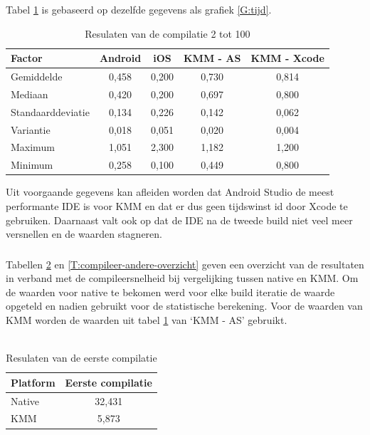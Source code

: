 Tabel \ref{T:compileer-andere} is gebaseerd op dezelfde gegevens als grafiek \ref{G:tijd}.
\begin{table}[H]
    \centering
    \caption{Resulaten van de compilatie 2 tot 100}
    \begin{tabular}{|l|c|c|c|c|}
        \hline
        {\textbf{Factor}} & {\textbf{Android}}  & {\textbf{iOS}} & {\textbf{KMM - AS}} & {\textbf{KMM - Xcode}}\\ \hline \hline
        Gemiddelde&0,458&0,200&0,730&0,814\\ \hline
        Mediaan&0,420&0,200&0,697&0,800\\ \hline
        Standaarddeviatie&0,134&0,226&0,142&0,062\\ \hline
        Variantie&0,018&0,051&0,020&0,004\\ \hline
        Maximum&1,051&2,300&1,182&1,200\\ \hline
        Minimum&0,258&0,100&0,449&0,800\\ \hline
    \end{tabular}
    \label{T:compileer-andere}
\end{table}

Uit voorgaande gegevens kan afleiden worden dat Android Studio de meest performante IDE is voor KMM en dat er dus geen tijdswinst id door Xcode te gebruiken. Daarnaast valt ook op dat de IDE na de tweede build niet veel meer versnellen en de waarden stagneren.

\subsubsection{}
\label{sec:M-test-compileersnelheid-conclusie}
Tabellen \ref{T:compileer-eerste-overzicht} en \ref{T:compileer-andere-overzicht} geven een overzicht van de resultaten in verband met de compileersnelheid bij vergelijking tussen native en KMM. Om de waarden voor native te bekomen werd voor elke build iteratie de waarde opgeteld en nadien gebruikt voor de statistische berekening. Voor de waarden van KMM worden de waarden uit tabel \ref{T:compileer-andere} van `KMM - AS' gebruikt.
\\ \\
\begin{table}[H]
    \centering
    \caption{Resulaten van de eerste compilatie}
    \begin{tabular}{|l|c|}
        \hline
        {\textbf{Platform}} & {\textbf{Eerste compilatie}} \\ \hline \hline
        Native&32,431\\ \hline
        KMM&5,873\\ \hline 
    \end{tabular}
    \label{T:compileer-eerste-overzicht}
\end{table}

